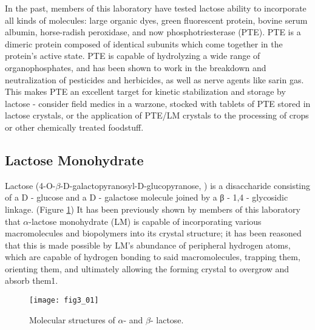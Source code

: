 \begin{refsection}
In the past, members of this laboratory have tested lactose ability to
incorporate all kinds of molecules: large organic dyes, green fluorescent
protein, bovine serum albumin, horse-radish peroxidase, and now
phosphotriesterase (PTE). PTE is a dimeric protein composed of identical
subunits which come together in the protein's active state. PTE is capable of
hydrolyzing a wide range of organophosphates, and has been shown to work in the
breakdown and neutralization of pesticides and herbicides, as well as nerve
agents like sarin gas. This makes PTE an excellent target for kinetic
stabilization and storage by lactose - consider field medics in a warzone,
stocked with tablets of PTE stored in lactose crystals, or the application of
PTE/LM crystals to the processing of crops or other chemically treated
foodstuff.

\subsection{Lactose Monohydrate}

Lactose (4-O-$\beta$-D-galactopyranosyl-D-glucopyranose, ) is a
disaccharide consisting of a D - glucose and a D - galactose molecule joined by
a β - 1,4 - glycosidic linkage. (Figure \ref{fig:lactose-structure})  It has
been previously shown by members of this laboratory that $\alpha$-lactose
monohydrate (LM) is capable of incorporating various macromolecules and
biopolymers into its crystal structure; it has been reasoned that this is made
possible by LM's abundance of peripheral hydrogen atoms, which are capable of
hydrogen bonding to said macromolecules, trapping them, orienting them, and
ultimately allowing the forming crystal to overgrow and absorb them1.

\begin{figure}[h!] \centering \texttt{[image: fig3\_01]}
    \caption[Molecular structures of $\alpha$- and $\beta$- lactose.]{Molecular
    structures of $\alpha$- and $\beta$- lactose.}
    \label{fig:lactose-structure}
\end{figure}


\end{refsection}
